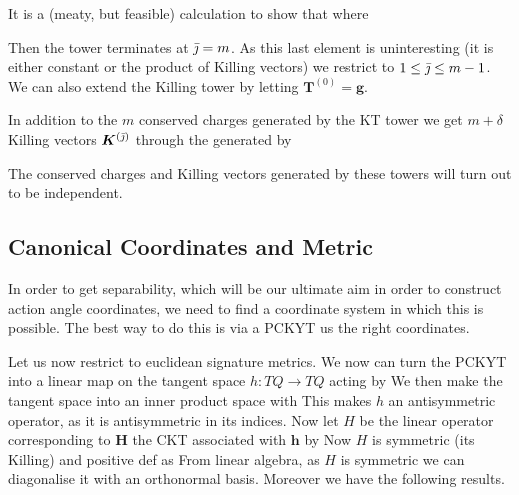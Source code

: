 \documentclass{article}
\begin{document}
It is a (meaty, but feasible) calculation to show that 
where 

 Then the tower terminates at ${\bar{\jmath}} = m$. As this last element is uninteresting (it is either constant or the product of Killing vectors) we restrict to $1 \leq {\bar{\jmath}} \leq m-1$. We can also extend the Killing tower by letting $\bm{T}^{(0)} = \bm{g}$.

In addition to the $m$ conserved charges generated by the KT tower we get $m+\delta$ Killing vectors $\bm{K}^{({\bar{\jmath}})}$ through the  generated by 

The conserved charges and Killing vectors generated by these towers will turn out to be independent. 

\subsection{Canonical Coordinates and Metric}

\begin{idea}
In order to get separability, which will be our ultimate aim in order to construct action angle coordinates, we need to find a coordinate system in which this is possible. The best way to do this is via a PCKYT  us the right coordinates. 
\end{idea}

Let us now restrict to euclidean signature metrics. We now can turn the PCKYT into a linear map on the tangent space $h:TQ \to TQ$  acting by 
We then make the tangent space into an inner product space with 
This makes $h$ an antisymmetric operator, as it is antisymmetric in its indices. Now let $H$ be the linear operator corresponding to $\bm{H}$ the CKT associated with $\bm{h}$ by 
Now $H$ is symmetric (its Killing) and positive def as 
From linear algebra, as $H$ is symmetric we can diagonalise it with an orthonormal basis. Moreover we have the following results. 
\end{document}
